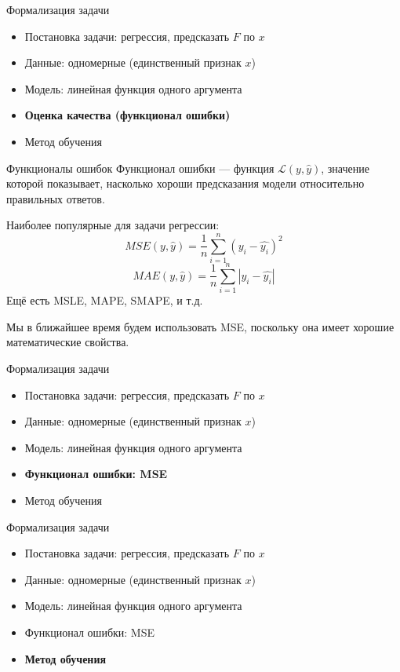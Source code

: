 \documentclass[aspectratio=169, professionalfonts]{beamer}
\begin{document}
\begin{frame}{Формализация задачи}
    \begin{itemize}
        \item Постановка задачи: регрессия, предсказать \( F \) по \( x \)
        \item Данные: одномерные (единственный признак \( x \))
        \item Модель: линейная функция одного аргумента
        \item \textbf{Оценка качества (функционал ошибки)}
        \item Метод обучения
    \end{itemize}
\end{frame}

\begin{frame}{Функционалы ошибок}
    Функционал ошибки --- функция \( \mathcal{L}(y, \hat{y}) \), значение
    которой показывает, насколько хороши предсказания модели относительно
    правильных ответов.
    \pause

    Наиболее популярные для задачи регрессии:
    {\large
        \[ MSE(y, \hat{y}) = \frac{1}{n} \sum_{i=1}^n {(y_i - \hat{y_i})}^2 \]
        \[ MAE (y, \hat{y}) = \frac{1}{n} \sum_{i=1}^n {|y_i - \hat{y_i}|} \]
    }
    Ещё есть MSLE, MAPE, SMAPE, и т.д.

    Мы в ближайшее время будем использовать MSE, поскольку она имеет хорошие
    математические свойства.
\end{frame}

\begin{frame}{Формализация задачи}
    \begin{itemize}
        \item Постановка задачи: регрессия, предсказать \( F \) по \( x \)
        \item Данные: одномерные (единственный признак \( x \))
        \item Модель: линейная функция одного аргумента
        \item \textbf{Функционал ошибки: MSE}
        \item Метод обучения
    \end{itemize}
\end{frame}

\begin{frame}{Формализация задачи}
    \begin{itemize}
        \item Постановка задачи: регрессия, предсказать \( F \) по \( x \)
        \item Данные: одномерные (единственный признак \( x \))
        \item Модель: линейная функция одного аргумента
        \item Функционал ошибки: MSE
        \item \textbf{Метод обучения}
    \end{itemize}
\end{frame}
\end{document}
